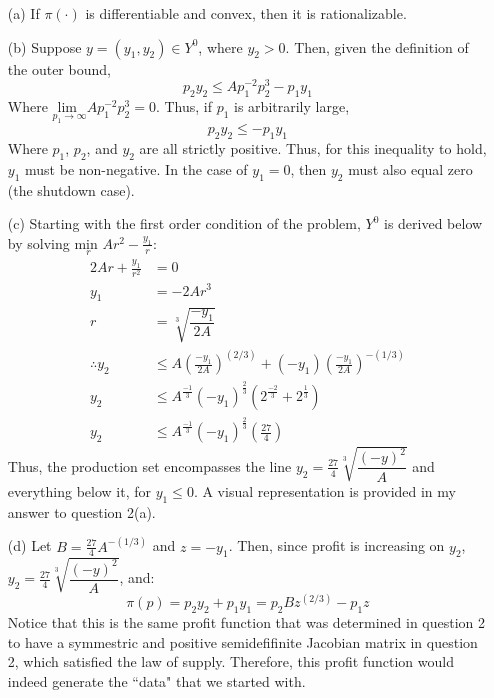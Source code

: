 \documentclass{article}
\begin{document}
\begin{itemize}
	\item[(a)] If $\pi(\cdot)$ is differentiable and convex, then it is rationalizable.
	
	\item[(b)] Suppose $y=(y_1,y_2)\in Y^0$, where $y_2>0$. Then, given the definition of the outer bound,
		\[
			p_2y_2 \leq Ap_1^{-2}p_2^3 - p_1y_1
		\]
		Where $\underset{p_1\rightarrow\infty}{\text{lim }}Ap_1^{-2}p_2^3=0$. Thus, if $p_1$ is arbitrarily large, 
		\[
			p_2y_2 \leq - p_1y_1
		\]
		Where $p_1$, $p_2$, and $y_2$ are all strictly positive. Thus, for this inequality to hold, $y_1$ must be non-negative. In the case of $y_1=0$, then $y_2$ must also equal zero (the shutdown case).
	
	\item[(c)] Starting with the first order condition of the problem, $Y^0$ is derived below by solving $\underset{r}{\text{min }}Ar^2-\frac{y_1}{r}$:
		\begin{align*}
			2Ar + \frac{y_1}{r^2} &= 0		\\
			y_1 &= -2Ar^3					\\
			r &= \sqrt[3]{\dfrac{-y_1}{2A}}	\\
			\therefore 	y_2 &\leq A\left(\frac{-y_1}{2A}\right)^{(2/3)} +(-y_1)\left(\frac{-y_1}{2A}\right)^{-(1/3)} 	\\
						y_2 &\leq A^{\frac{-1}{3}}(-y_1)^{\frac{2}{3}}\left(2^{\frac{-2}{3}}+2^\frac{1}{3}\right)		\\
						y_2 &\leq A^{\frac{-1}{3}}(-y_1)^{\frac{2}{3}}\left(\frac{27}{4}\right)
		\end{align*}
		Thus, the production set encompasses the line $y_2=\frac{27}{4}\sqrt[3]{\dfrac{(-y)^2}{A}}$ and everything below it, for $y_1\leq0$. A visual representation is provided in my answer to question 2(a).
		
	\item[(d)] Let $B=\frac{27}{4}A^{-(1/3)}$ and $z = -y_1$. Then, since profit is increasing on $y_2$, $y_2=\frac{27}{4}\sqrt[3]{\dfrac{(-y)^2}{A}}$, and:
		\[
			\pi(p) = p_2y_2 + p_1y_1 = p_2Bz^{(2/3)} - p_1z
		\]
		Notice that this is the same profit function that was determined in question 2 to have a symmestric and positive semidefifinite Jacobian matrix in question 2, which satisfied the law of supply. Therefore, this profit function would indeed generate the ``data" that we started with.
	
\end{itemize}



\end{document}
